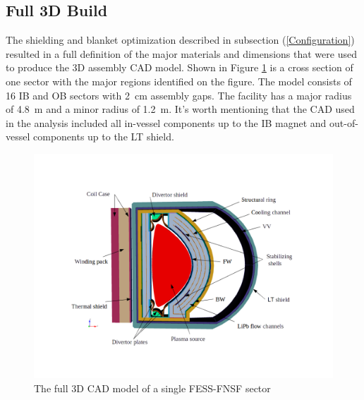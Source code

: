 \documentclass[12pt, letterpaper]{elsarticle}
\begin{document}
\subsection{Full 3D Build} \label{Full 3D Build}
The shielding and blanket optimization described in subsection (\ref{Configuration}) resulted in a full definition of the major materials and dimensions that were used to produce the 3D assembly CAD model. Shown in Figure \ref{fig:Full3D} is a cross section of one sector with the major regions identified on the figure. The model consists of 16 IB and OB sectors with \SI{2}{cm} assembly gaps. The facility has a major radius of \SI{4.8}{m} and a minor radius of \SI{1.2}{m}. It's worth mentioning that the CAD used in the analysis included all in-vessel components up to the IB magnet and out-of-vessel components up to the LT shield. 
\begin{figure}[h!]
  \centering
  \includegraphics[scale=0.35]{../plots/full_3d.png}
  \caption{The full 3D CAD model of a single FESS-FNSF sector}
  \label{fig:Full3D}
\end{figure}
\end{document}
